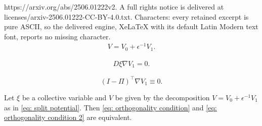 \documentclass[10pt,a4paper]{amsart}
\begin{document}
https://arxiv.org/abs/2506.01222v2. A full rights notice is delivered at licenses/arxiv-2506.01222-CC-BY-4.0.txt. Characters: every retained excerpt is pure ASCII, so the delivered engine, XeLaTeX with its default Latin Modern text font, reports no missing character.
\begin{align}
    V = V_0 + \epsilon^{-1}V_1. \label{eq: split potential} 
\end{align}

\begin{align}
    D\xi\nabla V_1 = 0. \label{eq: orthogonality condition} \tag{OC}
\end{align}

\begin{equation}
    (I - \Pi)^\top \nabla V_1 \equiv 0. \label{eq: orthogonality condition 2} \tag{POC}
\end{equation}

\begin{proposition}
\label{prop: oc poc equivalence}
    Let $\xi$ be a collective variable and $V$ be given by the decomposition $V= V_0 + \epsilon^{-1}V_{1}$ as in \eqref{eq: split potential}. Then \eqref{eq: orthogonality condition} and \eqref{eq: orthogonality condition 2} are equivalent. 
\end{proposition}
\end{document}
